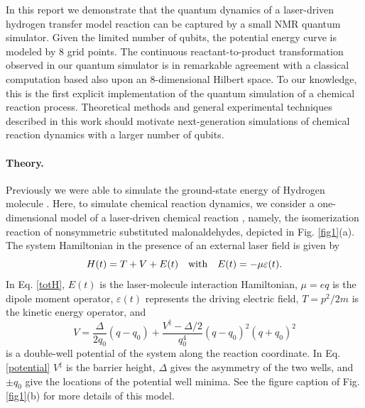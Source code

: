 \documentclass[twocolumn,showpacs,twoside,10pt,prl]{revtex4}
\newcommand{\be}{\begin{equation}}
\newcommand{\ee}{\end{equation}}
\begin{document}
In this report we demonstrate that the quantum dynamics
of a laser-driven hydrogen transfer model reaction can be captured by
a small NMR quantum simulator.
Given the limited number of qubits, the potential energy curve is modeled by 8 grid points.
The continuous reactant-to-product transformation observed in our quantum simulator is in remarkable agreement
with a classical computation based also upon an 8-dimensional Hilbert space.
To our knowledge, this is the first explicit implementation
of the quantum simulation of a chemical reaction process.  Theoretical methods and general experimental techniques described in this work should motivate
next-generation simulations of chemical reaction dynamics with a larger number of qubits.


\paragraph*{Theory.}

Previously we were able to simulate the ground-state energy of Hydrogen molecule \cite{static_exp2}.
Here, to simulate chemical reaction dynamics, we consider a one-dimensional model of a laser-driven chemical reaction \cite{hsubway}, namely,
the isomerization reaction of nonsymmetric substituted malonaldehydes, depicted in Fig. \ref{fig1}(a).
The system Hamiltonian in the presence of
an external laser field is given by
\be\label{totH}
  H(t)=  T+  V+  E(t) { \quad   \rm  with   \quad    }
                            E(t)=- \mu\varepsilon(t). 
\ee
In Eq. \ref{totH},  $E(t)$ is the laser-molecule interaction Hamiltonian,
$ \mu=e  q$ is the dipole moment operator,
$\varepsilon(t)$ represents the driving electric field,
$ {T}={  p}^2/2m$ is the kinetic energy operator, and
\be\label{potential}
 {V}=\frac{\Delta}{2q_0}(  q-q_0)+\frac{V^\ddag-\Delta/2}{q_0^4}(  q-q_0)^2(  q+q_0)^2
\ee
is a double-well potential of the system along the reaction coordinate. In Eq. \ref{potential}
$V^\ddag$ is the barrier height, $\Delta$ gives the asymmetry of the two wells, and $\pm q_0$ give the locations of the potential well minima.
See the figure caption of Fig. \ref{fig1}(b) for more details of this model.
\end{document}
